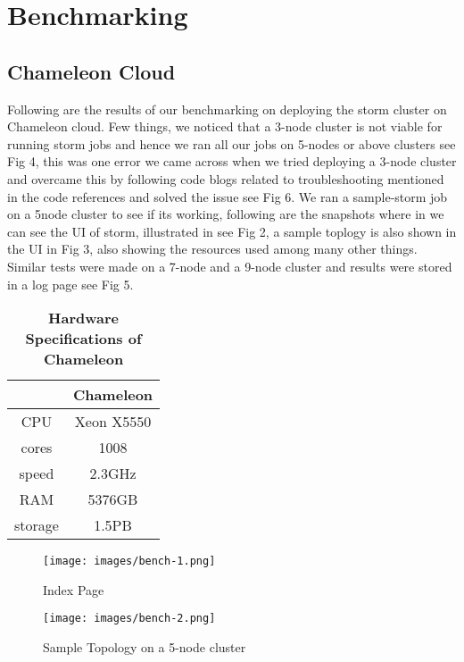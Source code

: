 \documentclass[9pt,twocolumn,twoside]{../../styles/osajnl}
\begin{document}
\section{Benchmarking}
\subsection{Chameleon Cloud}
Following are the results of our benchmarking on deploying the storm
cluster on Chameleon cloud. Few things, we noticed that a 3-node
cluster is not viable for running storm jobs and hence we ran all our
jobs on 5-nodes or above clusters see Fig 4, this was one error we
came across when we tried deploying a 3-node cluster and overcame this
by following code blogs related to troubleshooting mentioned in the
code references and solved the issue see Fig 6. We ran a sample-storm job on a
5node cluster to see if its working, following are the snapshots where
in we can see the UI of storm, illustrated in see Fig 2, a sample
toplogy is also shown in the UI in Fig 3, also showing the resources
used among many other things. Similar tests were made on a 7-node and
a 9-node cluster and results were stored in a log page see Fig 5.



\begin{table}[htbp]
\centering
\caption{\bf Hardware Specifications of Chameleon}

 \begin{tabular} {| c | c |}
\hline
  & Chameleon   \\ [0.5ex] 
 \hline

    
CPU   & Xeon X5550  \\
 \hline
cores & 1008   \\
 \hline
speed & 2.3GHz \\
 \hline
RAM   & 5376GB  \\
 \hline
storage & 1.5PB  \\ [1ex] 
 \hline

\end{tabular}
  \label{tab:cloud-comparison}
\end{table}

\begin{figure}[!htb]
  \texttt{[image: images/bench-1.png]}
  \caption{Index Page}
  \label{Index Page}
\end{figure}


\begin{figure}[!htb]
  \texttt{[image: images/bench-2.png]}
  \caption{Sample Topology on a 5-node cluster }
  \label{Sample Topology on a 5-node cluster}
\end{figure}
\end{document}
